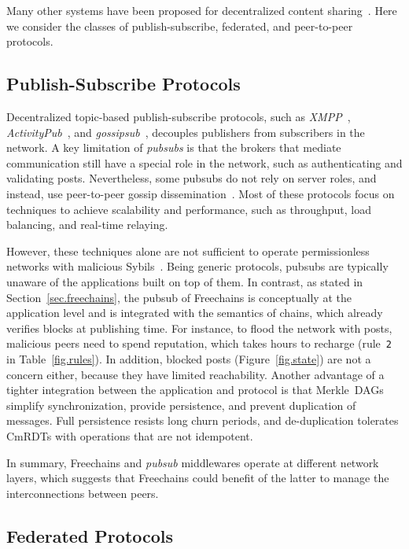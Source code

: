 \documentclass[10pt,journal,compsoc]{IEEEtran}
\newcommand{\FC}       {Freechains\xspace}
\newcommand{\code}[1]  {\texttt{\footnotesize{#1}}}
\begin{document}
Many other systems have been proposed for decentralized content
sharing~\cite{p2p.survey,p2p.ecosystem}.
Here we consider the classes of publish-subscribe, federated, and peer-to-peer
protocols.

\subsection{Publish-Subscribe Protocols}

Decentralized topic-based publish-subscribe protocols, such as
    \emph{XMPP}~\cite{pubsub.xmpp},
    \emph{ActivityPub}~\cite{pubsub.activitypub}, and
    \emph{gossipsub}~\cite{pubsub.gossipsub},
decouples publishers from subscribers in the network.
%
A key limitation of \emph{pubsubs} is that the brokers that mediate
communication still have a special role in the network, such as authenticating
and validating posts.
%
Nevertheless, some pubsubs do not rely on server roles, and instead, use
peer-to-peer gossip dissemination~\cite{pubsub.tera,pubsub.rappel,pubsub.stan,pubsub.vitis,pubsub.gossipsub,pubsub.rappel}.
Most of these protocols focus on techniques to achieve scalability and
performance, such as throughput, load balancing, and real-time relaying.

However, these techniques alone are not sufficient to operate permissionless
networks with malicious Sybils~\cite{pubsub.gossipsub2}.
Being generic protocols, pubsubs are typically unaware of the applications
built on top of them.
%
In contrast, as stated in Section~\ref{sec.freechains}, the pubsub of \FC is
conceptually at the application level and is integrated with the semantics of
chains, which already verifies blocks at publishing time.
For instance, to flood the network with posts, malicious peers need to spend
reputation, which takes hours to recharge (rule~\code{2} in
Table~\ref{fig.rules}).
In addition, blocked posts (Figure~\ref{fig.state}) are not a concern either,
because they have limited reachability.
Another advantage of a tighter integration between the application and protocol
is that Merkle~DAGs simplify synchronization, provide persistence, and prevent
duplication of messages.
Full persistence resists long churn periods, and de-duplication tolerates
CmRDTs with operations that are not idempotent.

In summary, \FC and \emph{pubsub} middlewares operate at different network
layers, which suggests that \FC could benefit of the latter to manage the
interconnections between peers.

\subsection{Federated Protocols}
\end{document}
